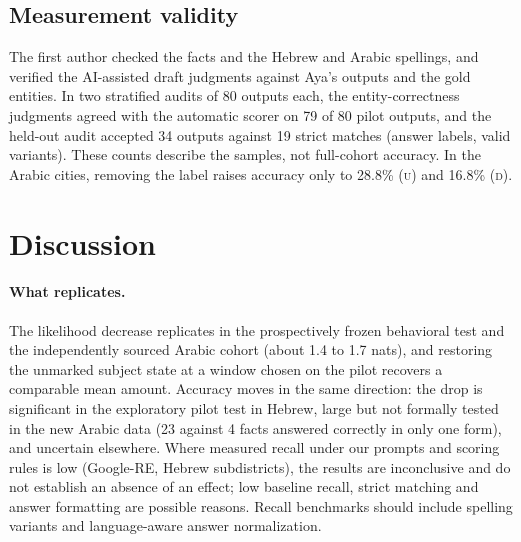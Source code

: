 \documentclass[11pt]{article}
\newcommand{\U}{\textsc{u}}
\newcommand{\D}{\textsc{d}}
\begin{document}
\subsection{Measurement validity}
\label{sec:validity}
The first author checked the facts and the Hebrew and Arabic spellings, and
verified the AI-assisted draft judgments against Aya's outputs and the gold
entities. In two stratified audits of 80 outputs each, the entity-correctness
judgments agreed with the automatic scorer on 79 of 80 pilot outputs, and the
held-out audit accepted 34 outputs against 19 strict matches (answer labels,
valid variants). These counts describe the samples, not full-cohort accuracy. In the Arabic cities, removing the label raises accuracy only to 28.8\% (\U) and 16.8\% (\D).

\section{Discussion}
\label{sec:discussion}

\paragraph{What replicates.} The likelihood decrease replicates in the
prospectively frozen behavioral test and the independently sourced Arabic cohort
(about 1.4 to 1.7 nats), and restoring the unmarked subject state at a window
chosen on the pilot recovers a comparable mean amount. Accuracy
moves in the same direction: the drop is significant in the exploratory pilot
test in Hebrew, large but not formally tested in the new Arabic data (23 against
4 facts answered correctly in only one form), and uncertain elsewhere. Where
measured recall
under our prompts and scoring rules is low (Google-RE, Hebrew subdistricts), the
results are inconclusive and do not establish an absence of an effect; low
baseline recall, strict matching and answer formatting are possible reasons. Recall benchmarks should include spelling variants and language-aware answer normalization.
\end{document}
